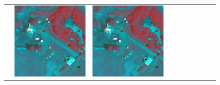 \begin{figure}[H]
\begin{tabularx}{\textwidth}{c|*{9}{X}}
    & \includegraphics[trim={730pt 220pt 200pt 720pt},clip,width=\linewidth]{images/015Results/02perm_exp/comp_images/gbndvi/523.png}
    & \includegraphics[trim={850pt 110pt 80pt 830pt},clip,width=\linewidth]{images/015Results/02perm_exp/comp_images/gbndvi/523.png}

\end{tabularx}
\end{figure}
